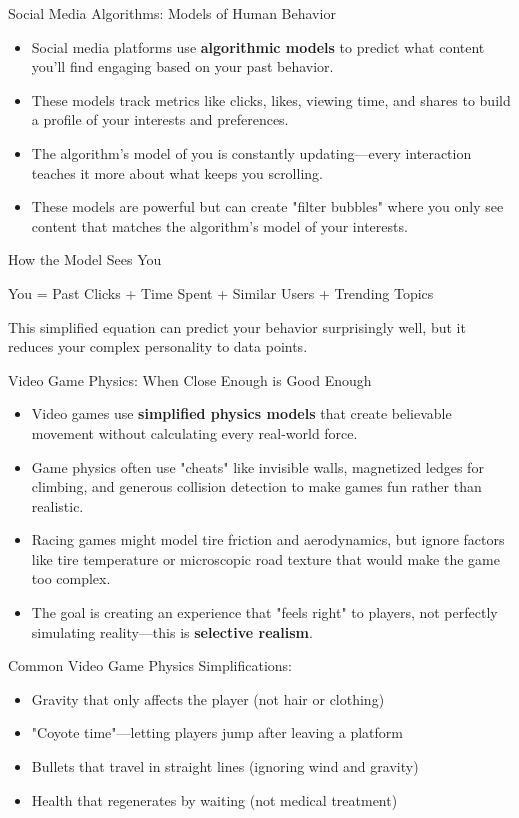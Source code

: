 \documentclass{beamer}
\begin{document}
	\begin{frame}{Social Media Algorithms: Models of Human Behavior}
		\begin{itemize}
			\item Social media platforms use \textbf{algorithmic models} to predict what content you'll find engaging based on your past behavior.
			\item These models track metrics like clicks, likes, viewing time, and shares to build a profile of your interests and preferences.
			\item The algorithm's model of you is constantly updating—every interaction teaches it more about what keeps you scrolling.
			\item These models are powerful but can create "filter bubbles" where you only see content that matches the algorithm's model of your interests.
		\end{itemize}
		
		\begin{block}{How the Model Sees You}
			\begin{center}
				You = Past Clicks + Time Spent + Similar Users + Trending Topics
			\end{center}
			This simplified equation can predict your behavior surprisingly well, but it reduces your complex personality to data points.
		\end{block}
	\end{frame}
	
	\begin{frame}{Video Game Physics: When Close Enough is Good Enough}
		\begin{itemize}
			\item Video games use \textbf{simplified physics models} that create believable movement without calculating every real-world force.
			\item Game physics often use "cheats" like invisible walls, magnetized ledges for climbing, and generous collision detection to make games fun rather than realistic.
			\item Racing games might model tire friction and aerodynamics, but ignore factors like tire temperature or microscopic road texture that would make the game too complex.
			\item The goal is creating an experience that "feels right" to players, not perfectly simulating reality—this is \textbf{selective realism}.
		\end{itemize}
		
		\begin{example}
			\scriptsize
			Common Video Game Physics Simplifications:
			\begin{itemize}
				\item Gravity that only affects the player (not hair or clothing)
				\item "Coyote time"—letting players jump after leaving a platform
				\item Bullets that travel in straight lines (ignoring wind and gravity)
				\item Health that regenerates by waiting (not medical treatment)
			\end{itemize}
		\end{example}
	\end{frame}
	
\end{document}
